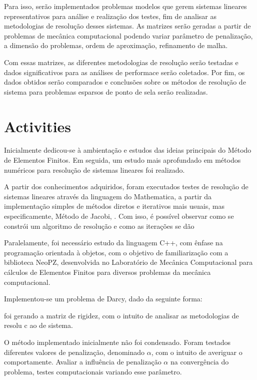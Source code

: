 \documentclass[12pt]{article}
\begin{document}

Para isso, serão implementados problemas modelos que gerem sistemas lineares representativos para análise e realização dos testes, fim de 
analisar as metodologias de resolução desses sistemas. As matrizes serão geradas a partir de problemas de mecânica computacional 
podendo variar parâmetro de penalização, a dimensão do problemas, ordem de aproximação, refinamento de malha. 

Com essas matrizes, as diferentes metodologias de resolução serão testadas e dados significativos para as análises de performace serão coletados.
Por fim, os dados obtidos serão comparados e conclusões sobre os métodos de resolução de sistema para problemas esparsos de ponto de sela serão 
realizadas.

\section{Activities}

Inicialmente dedicou-se à ambientação e estudos das ideias principais do Método de Elementos Finitos. Em seguida, um estudo mais aprofundado em 
métodos numéricos para resolução de sistemas lineares foi realizado. 

A partir dos conhecimentos adquiridos, foram executados testes de resolução de sistemas lineares através da linguagem do Mathematica, a partir da 
implementação simples de métodos diretos e iterativos mais usuais, mas especificamente, Método de Jacobi, . Com isso, é possível observar como se constrói um algoritmo de resolução e como as iterações se dão

Paralelamente, foi necessário estudo da linguagem C++, com ênfase na programação orientada à objetos, com o objetivo de familiarização 
com a biblioteca NeoPZ, desenvolvida no Laboratório de Mecânica Computacional para cálculos de Elementos Finitos para diversos problemas 
da mecânica computacional. 

Implementou-se um problema de Darcy, dado da seguinte forma:


foi gerando a matriz de rigidez, com o intuito de analisar as metodologias de resolu c ao de sistema. 

O método implementado inicialmente não foi condensado. Foram testados diferentes valores de penalização, denominado \(\alpha\), com o 
intuito de averiguar o comportamente.
Avaliar a influência de penalização \(\alpha\) na convergência do problema, testes computacionais variando esse parâmetro.
\end{document}
